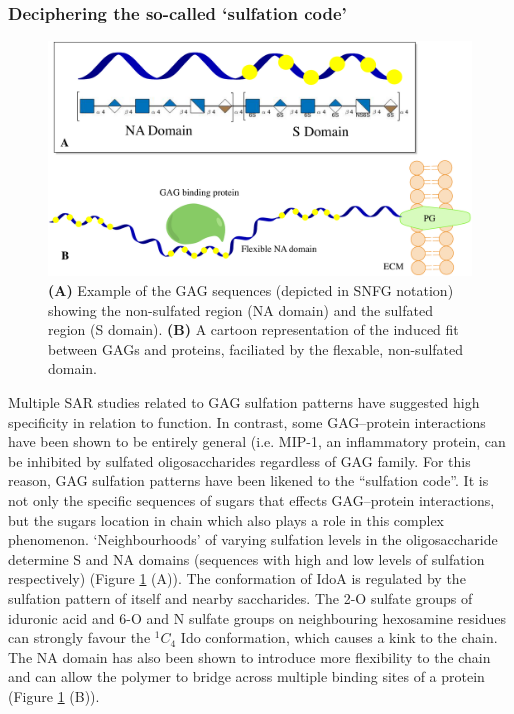 \documentclass[journal=jctcce,manuscript=article]{achemso}
\begin{document}
{\subsubsection{Deciphering the so-called `sulfation code'}

\begin{figure}[bl!]
    \centering
    \includegraphics[width=13cm]{NAandSdomain.pdf}
    \caption{\textbf{(A)} Example of the GAG sequences (depicted in SNFG notation) showing the non-sulfated region (NA domain) and the sulfated region (S domain). \textbf{(B)} A cartoon representation of the induced fit between GAGs and proteins, faciliated by the flexable, non-sulfated domain.}
    \label{fig:Sdomain}
\end{figure}

Multiple \ac{SAR} studies related to \ac{GAG} sulfation patterns have suggested high specificity in relation to function.\cite{Habuchi2004SulfationCode, Gama2006SulfationActivity} 
In contrast, some \ac{GAG}--protein interactions have been shown to be entirely general (i.e. MIP-1\textalpha, an inflammatory protein, can be inhibited by sulfated oligosaccharides regardless of \ac{GAG} family. \cite{Kuschert1999GlycosaminoglycansResponses}
For this reason, GAG sulfation patterns have been likened to the “sulfation code”. \cite{Habuchi2004SulfationCode, Swarup2013SugarNeurons, Kowitsch2018MedicalReview, Gama2006SulfationActivity}
It is not only the specific sequences of sugars that effects GAG--protein interactions, but the sugars location in chain which also plays a role in this complex phenomenon. \cite{Capila2002Heparin-proteinInteractions.}
`Neighbourhoods' of varying sulfation levels in the oligosaccharide determine S and NA domains (sequences with high and low levels of sulfation respectively) (Figure \ref{fig:Sdomain} (A)). \cite{Gandhi2008TheProteins}
The conformation of IdoA is regulated by the sulfation pattern of itself and nearby saccharides. \cite{Hsieh2016Uncoveringe}
The 2-O sulfate groups of iduronic acid and 6-O and N sulfate groups on neighbouring hexosamine residues can strongly favour the $^{1}C_{4}$ Ido conformation, which causes a kink to the chain. \cite{Raman2005StructuralInteractions}
The NA domain has also been shown to introduce more flexibility to the chain and can allow the polymer to bridge across multiple binding sites of a protein (Figure \ref{fig:Sdomain} (B)). \cite{Capila2002Heparin-proteinInteractions., Nahain2018HeparinActivity, Li2004StructureHeparin, Dementiev2004TheSpecificity}

}
\end{document}
